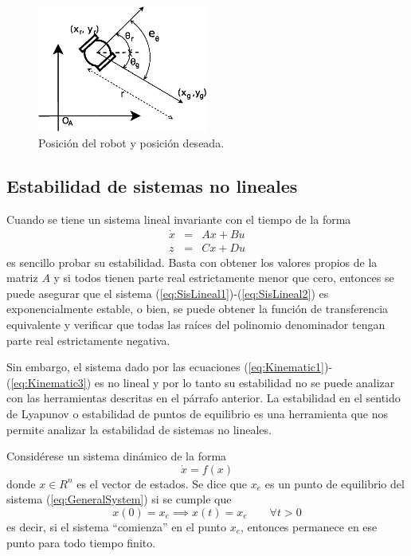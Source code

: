\documentclass[letterpaper,12pt]{article}
\begin{document}
\begin{figure}
\centering
\includegraphics[width=0.5\textwidth]{Figures/GoalPose.eps}
\caption{Posición del robot y posición deseada.}
\label{fig:Coords}
\end{figure}


\subsection{Estabilidad de sistemas no lineales}
Cuando se tiene un sistema lineal invariante con el tiempo de la forma
\begin{eqnarray}
  \dot{x} &=& Ax + Bu\label{eq:SisLineal1}\\
  z &=& Cx + Du\label{eq:SisLineal2}
\end{eqnarray}
es sencillo probar su estabilidad. Basta con obtener los valores propios de la matriz $A$ y si todos tienen parte real estrictamente menor que cero, entonces se puede asegurar que el sistema (\ref{eq:SisLineal1})-(\ref{eq:SisLineal2}) es exponencialmente estable, o bien, se puede obtener la función de transferencia equivalente y verificar que todas las raíces del polinomio denominador tengan parte real estrictamente negativa.

Sin embargo, el sistema dado por las ecuaciones (\ref{eq:Kinematic1})-(\ref{eq:Kinematic3}) es no lineal y por lo tanto su estabilidad no se puede analizar con las herramientas descritas en el párrafo anterior. La estabilidad en el sentido de Lyapunov o estabilidad de puntos de equilibrio es una herramienta que nos permite analizar la estabilidad de sistemas no lineales. 

Considérese un sistema dinámico de la forma 
\begin{equation}
\dot{x} = f(x) \label{eq:GeneralSystem}
\end{equation}
donde $x\in R^n$ es el vector de estados. Se dice que $x_e$ es un punto de equilibrio del sistema (\ref{eq:GeneralSystem}) si se cumple que
\begin{equation}
  \label{eq:Equilibrium}
  x(0) = x_e \implies x(t) = x_e \qquad\forall t > 0
\end{equation}
es decir, si el sistema ``comienza'' en el punto $x_e$, entonces permanece en ese punto para todo tiempo finito.
\end{document}
